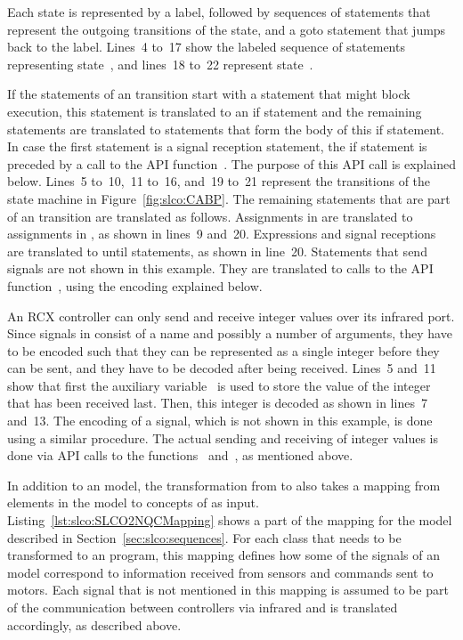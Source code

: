 Each state is represented by a label, followed by sequences of statements that represent the outgoing transitions of the state, and a goto statement that jumps back to the label.
Lines~4 to~17 show the labeled sequence of statements representing state~, and lines~18 to~22 represent state~.

If the statements of an \SLCO transition start with a statement that might block execution, this statement is translated to an \NQC if statement and the remaining \SLCO statements are translated to \NQC statements that form the body of this if statement.
In case the first statement is a signal reception statement, the if statement is preceded by a call to the API function~.
The purpose of this API call is explained below.
Lines~5 to~10,~11 to~16, and~19 to~21 represent the transitions of the state machine in Figure~\ref{fig:slco:CABP}.
The remaining statements that are part of an \SLCO transition are translated as follows.
Assignments in \SLCO are translated to assignments in \NQC, as shown in lines~9 and~20.
Expressions and signal receptions are translated to until statements, as shown in line~20.
Statements that send signals are not shown in this example.
They are translated to calls to the API function~, using the encoding explained below.

An RCX controller can only send and receive integer values over its infrared port.
Since signals in \SLCO consist of a name and possibly a number of arguments, they have to be encoded such that they can be represented as a single integer before they can be sent, and they have to be decoded after being received.
Lines~5 and~11 show that first the auxiliary variable~ is used to store the value of the integer that has been received last.
Then, this integer is decoded as shown in lines~7 and~13.
The encoding of a signal, which is not shown in this example, is done using a similar procedure.
The actual sending and receiving of integer values is done via API calls to the functions~ and~, as mentioned above.

In addition to an \SLCO model, the transformation from \SLCO to \NQC also takes a mapping from elements in the \SLCO model to concepts of \NQC as input.
Listing~\ref{lst:slco:SLCO2NQCMapping} shows a part of the mapping for the model described in Section~\ref{sec:slco:sequences}.
For each class that needs to be transformed to an \NQC program, this mapping defines how some of the signals of an \SLCO model correspond to information received from sensors and commands sent to motors.
Each signal that is not mentioned in this mapping is assumed to be part of the communication between controllers via infrared and is translated accordingly, as described above.

